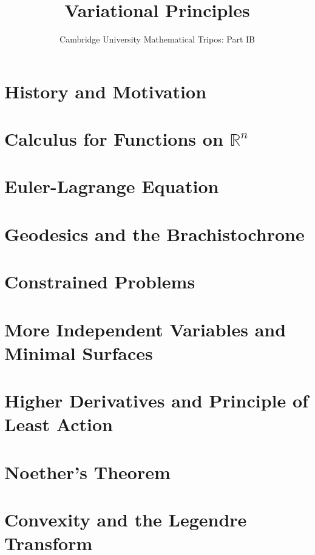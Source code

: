 \documentclass{article}
\title{Variational Principles}
\author{Cambridge University Mathematical Tripos: Part IB}
\begin{document}
\maketitle

\tableofcontentsnewpage{}

\section{History and Motivation}

\section{Calculus for Functions on \(\mathbb R^n\)}

\section{Euler-Lagrange Equation}

\section{Geodesics and the Brachistochrone}

\section{Constrained Problems}

\section{More Independent Variables and Minimal Surfaces}

\section{Higher Derivatives and Principle of Least Action}

\section{Noether's Theorem}

\section{Convexity and the Legendre Transform}

\end{document}
